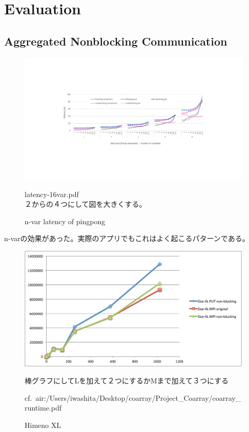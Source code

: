 \section{Evaluation}\label{sec:eval}

\subsection{Aggregated Nonblocking Communication}


\begin{figure}[tbh]
  \begin{center}
  \includegraphics[scale=0.55,trim=6cm 0cm 4cm 6cm,clip]{figs/latency-16var.pdf}

  latency-16var.pdf\\
  ２からの４つにして図を大きくする。
  \caption{n-var latency of pingpong}\label{fig:nvar-pp}
  \end{center}
\end{figure}

n-varの効果があった。実際のアプリでもこれはよく起こるパターンである。


\begin{figure}[tbh]
  \begin{center}
  \includegraphics[scale=0.55]{figs/himeno.pdf}

  棒グラフにしてLを加えて２つにするかMまで加えて３つにする

  cf.\ air:/Users/iwashita/Desktop/coarray/Project\_Coarray/coarray\_runtime.pdf

  \caption{Himeno XL}\label{fig:himeno}
  \end{center}
\end{figure}


